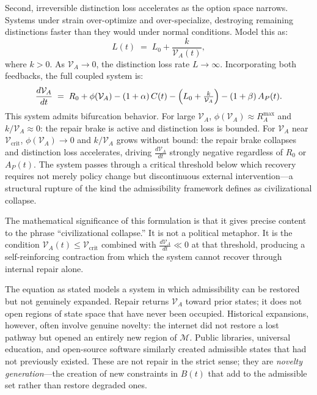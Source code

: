 \documentclass[11pt, letterpaper]{article}
\begin{document}
Second, irreversible distinction loss accelerates as the option space narrows. Systems under strain over-optimize and over-specialize, destroying remaining distinctions faster than they would under normal conditions. Model this as:
\[
  L(t) \;=\; L_0 + \frac{k}{\mathcal{V}_A(t)},
\]
where $k > 0$. As $\mathcal{V}_A \to 0$, the distinction loss rate $L \to \infty$. Incorporating both feedbacks, the full coupled system is:
\[
  \frac{d\mathcal{V}_A}{dt} \;=\; R_0 + \phi(\mathcal{V}_A) - (1+\alpha)\,C(t) - \Bigl(L_0 + \tfrac{k}{\mathcal{V}_A}\Bigr) - (1+\beta)\,A_P(t).
\]
This system admits bifurcation behavior. For large $\mathcal{V}_A$, $\phi(\mathcal{V}_A) \approx R_A^{\max}$ and $k/\mathcal{V}_A \approx 0$: the repair brake is active and distinction loss is bounded. For $\mathcal{V}_A$ near $\mathcal{V}_{\text{crit}}$, $\phi(\mathcal{V}_A) \to 0$ and $k/\mathcal{V}_A$ grows without bound: the repair brake collapses and distinction loss accelerates, driving $\frac{d\mathcal{V}_A}{dt}$ strongly negative regardless of $R_0$ or $A_P(t)$. The system passes through a critical threshold below which recovery requires not merely policy change but discontinuous external intervention---a structural rupture of the kind the admissibility framework defines as civilizational collapse.

The mathematical significance of this formulation is that it gives precise content to the phrase ``civilizational collapse.'' It is not a political metaphor. It is the condition $\mathcal{V}_A(t) \leq \mathcal{V}_{\text{crit}}$ combined with $\frac{d\mathcal{V}_A}{dt} \ll 0$ at that threshold, producing a self-reinforcing contraction from which the system cannot recover through internal repair alone.

The equation as stated models a system in which admissibility can be restored but not genuinely expanded. Repair returns $\mathcal{V}_A$ toward prior states; it does not open regions of state space that have never been occupied. Historical expansions, however, often involve genuine novelty: the internet did not restore a lost pathway but opened an entirely new region of $\mathcal{M}$. Public libraries, universal education, and open-source software similarly created admissible states that had not previously existed. These are not repair in the strict sense; they are \emph{novelty generation}---the creation of new constraints in $B(t)$ that add to the admissible set rather than restore degraded ones.
\end{document}

